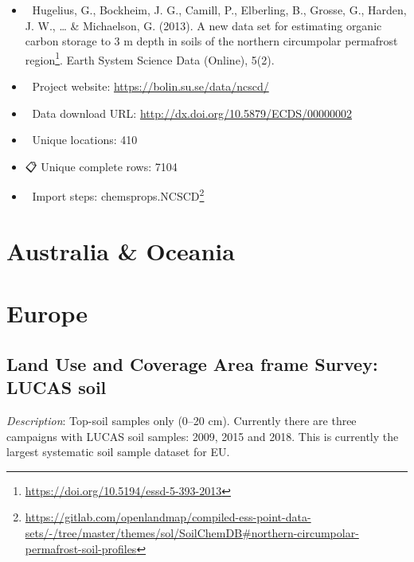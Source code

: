 \documentclass[
  graybox,natbib,nospthms]{svmono}
\providecommand{\tightlist}{%
  \setlength{\itemsep}{0pt}\setlength{\parskip}{0pt}}
\providecommand{\tightlist}{\setlength{\itemsep}{0pt}\setlength{\parskip}{0pt}}
\renewcommand{\href}[2]{#2 (\url{#1})}
\renewcommand{\href}[2]{#2\footnote{\url{#1}}}
\begin{document}
\begin{itemize}
\tightlist
\item
  📕 Hugelius, G., Bockheim, J. G., Camill, P., Elberling, B., Grosse, G., Harden, J. W., \ldots{} \& Michaelson, G. (2013). \href{https://doi.org/10.5194/essd-5-393-2013}{A new data set for estimating organic carbon storage to 3 m depth in soils of the northern circumpolar permafrost region}. Earth System Science Data (Online), 5(2).\\
\item
  🔗 Project website: \url{https://bolin.su.se/data/ncscd/}\\
\item
  📂 Data download URL: \url{http://dx.doi.org/10.5879/ECDS/00000002}\\
\item
  📍 Unique locations: 410\\
\item
  📋 Unique complete rows: 7104\\
\item
  📝 Import steps: \href{https://gitlab.com/openlandmap/compiled-ess-point-data-sets/-/tree/master/themes/sol/SoilChemDB\#northern-circumpolar-permafrost-soil-profiles}{chemsprops.NCSCD}
\end{itemize}

\hypertarget{australia-oceania}{%
\section{Australia \& Oceania}\label{australia-oceania}}

\hypertarget{europe}{%
\section{Europe}\label{europe}}

\hypertarget{land-use-and-coverage-area-frame-survey-lucas-soil}{%
\subsection{Land Use and Coverage Area frame Survey: LUCAS soil}\label{land-use-and-coverage-area-frame-survey-lucas-soil}}

\emph{Description}: Top-soil samples only (0--20 cm). Currently there are three
campaigns with LUCAS soil samples: 2009, 2015 and 2018. This is currently the largest
systematic soil sample dataset for EU.
\end{document}
